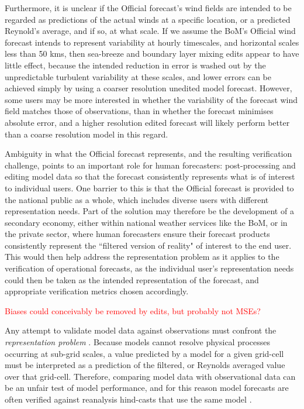 \documentclass[twocol]{ametsoc}
\begin{document}
Furthermore, it is unclear if the Official forecast's wind fields are intended to be regarded as predictions of the actual winds at a specific location, or a predicted Reynold's average, and if so, at what scale. If we assume the BoM's Official wind forecast intends to represent variability at hourly timescales, and horizontal scales less than 50 kms, then sea-breeze and boundary layer mixing edits appear to have little effect, because the intended reduction in error is washed out by the unpredictable turbulent variability at these scales, and lower errors can be achieved simply by using a coarser resolution unedited model forecast. However, some users may be more interested in whether the variability of the forecast wind field matches those of observations, than in whether the forecast minimises absolute error, and a higher resolution edited forecast will likely perform better than a coarse resolution model in this regard. 

Ambiguity in what the Official forecast represents, and the resulting verification challenge, points to an important role for human forecasters: post-processing and editing model data so that the forecast consistently represents what is of interest to individual users. One barrier to this is that the Official forecast is provided to the national public as a whole, which includes diverse users with different representation needs. Part of the solution may therefore be the development of a secondary economy, either within national weather services like the BoM, or in the private sector, where human forecasters ensure their forecast products consistently represent the ``filtered version of reality" of interest to the end user. This would then help address the representation problem as it applies to the verification of operational forecasts, as the individual user's representation needs could then be taken as the intended representation of the forecast, and appropriate verification metrics chosen accordingly.    

\textcolor{red}{Biases could conceivably be removed by edits, but probably not MSEs?}



Any attempt to validate model data against observations must confront the \textit{representation problem} \citep[e.g.][]{zaron06}. Because models cannot resolve physical processes occurring at sub-grid scales, a value predicted by a model for a given grid-cell must be interpreted as a prediction of the filtered, or Reynolds averaged value over that grid-cell. Therefore, comparing model data with observational data can be an unfair test of model performance, and for this reason model forecasts are often verified against reanalysis hind-casts that use the same model \citep[e.g.][]{lynch14}.
\end{document}

